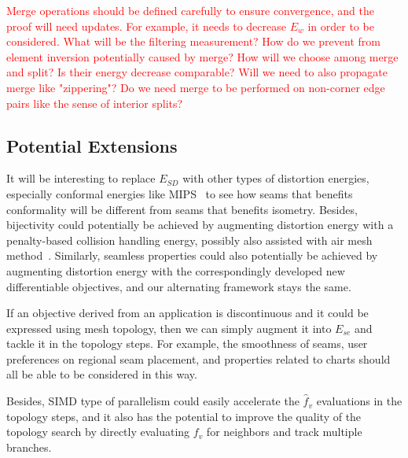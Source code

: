 \textcolor{red}{
Merge operations should be defined carefully to ensure convergence, and the proof will need updates.
For example, it needs to decrease $E_w$ in order to be considered. 
What will be the filtering measurement?
How do we prevent from element inversion potentially caused by merge?
How will we choose among merge and split? Is their energy decrease comparable?
Will we need to also propagate merge like "zippering"?
Do we need merge to be performed on non-corner edge pairs like the sense of interior splits? 
}

\subsection{Potential Extensions}
It will be interesting to replace $E_{SD}$ with other types of distortion energies, especially conformal energies like MIPS~\cite{Hormann2000MIPS} to see how seams that benefits conformality will be different from seams that benefits isometry.
Besides, bijectivity could potentially be achieved by augmenting distortion energy with a penalty-based collision handling energy, possibly also assisted with air mesh method~\cite{?}.
Similarly, seamless properties could also potentially be achieved by augmenting distortion energy with the correspondingly developed new differentiable objectives, and our alternating framework stays the same.

If an objective derived from an application is discontinuous and it could be expressed using mesh topology, then we can simply augment it into $E_{se}$ and tackle it in the topology steps. For example, the smoothness of seams, user preferences on regional seam placement, and properties related to charts should all be able to be considered in this way.

Besides, SIMD type of parallelism could easily accelerate the $\hat{f}_v$ evaluations in the topology steps, and it also has the potential to improve the quality of the topology search by directly evaluating $f_v$ for neighbors and track multiple branches.